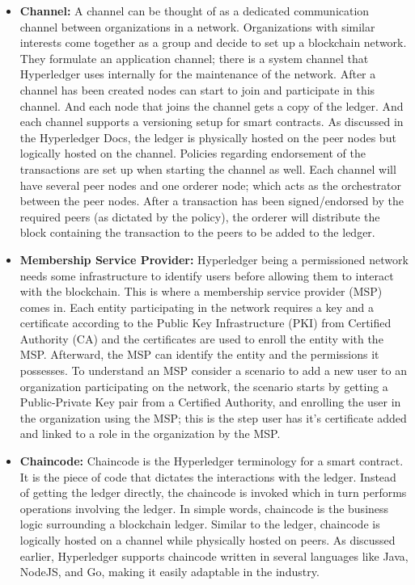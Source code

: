 \begin{itemize}
    \item \textbf{Channel:} A channel can be thought of as a dedicated communication channel between organizations in a network. Organizations with similar interests come together as a group and decide to set up a blockchain network. They formulate an application channel; there is a system channel that Hyperledger uses internally for the maintenance of the network. After a channel has been created nodes can start to join and participate in this channel. And each node that joins the channel gets a copy of the ledger. And each channel supports a versioning setup for smart contracts. As discussed in the \cite{fabric-network} Hyperledger Docs, the ledger is physically hosted on the peer nodes but logically hosted on the channel. Policies regarding endorsement of the transactions are set up when starting the channel as well. Each channel will have several peer nodes and one orderer node; which acts as the orchestrator between the peer nodes. After a transaction has been signed/endorsed by the required peers (as dictated by the policy), the orderer will distribute the block containing the transaction to the peers to be added to the ledger.
    \item \textbf{Membership Service Provider:} Hyperledger being a permissioned network needs some infrastructure to identify users before allowing them to interact with the blockchain. This is where a membership service provider (MSP) comes in. Each entity participating in the network requires a key and a certificate according to the Public Key Infrastructure (PKI) from Certified Authority (CA) and the certificates are used to enroll the entity with the MSP. Afterward, the MSP can identify the entity and the permissions it possesses. To understand an MSP consider a scenario to add a new user to an organization participating on the network, the scenario starts by getting a Public-Private Key pair from a Certified Authority, and enrolling the user in the organization using the MSP; this is the step user has it's certificate added and linked to a role in the organization by the MSP.
    \item \textbf{Chaincode:} Chaincode is the Hyperledger terminology for a smart contract. It is the piece of code that dictates the interactions with the ledger. Instead of getting the ledger directly, the chaincode is invoked which in turn performs operations involving the ledger. In simple words, chaincode is the business logic surrounding a blockchain ledger. Similar to the ledger, chaincode is logically hosted on a channel while physically hosted on peers. As discussed earlier, Hyperledger supports chaincode written in several languages like Java, NodeJS, and Go, making it easily adaptable in the industry.
\end{itemize}

